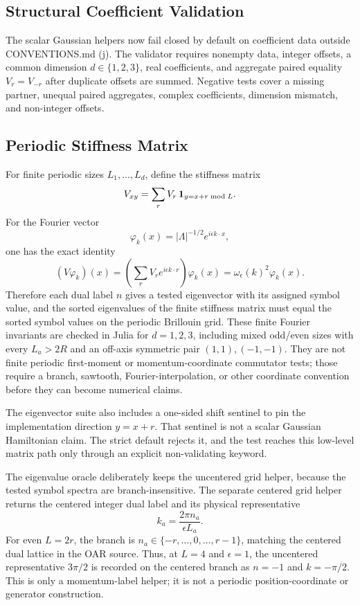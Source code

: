 \subsection{Structural Coefficient Validation}

The scalar Gaussian helpers now fail closed by default on coefficient data
outside CONVENTIONS.md (j).  The validator requires nonempty data, integer
offsets, a common dimension \(d\in\{1,2,3\}\), real coefficients, and aggregate
paired equality \(V_r=V_{-r}\) after duplicate offsets are summed.  Negative
tests cover a missing partner, unequal paired aggregates, complex coefficients,
dimension mismatch, and non-integer offsets.

\subsection{Periodic Stiffness Matrix}

For finite periodic sizes \(L_1,\ldots,L_d\), define the stiffness matrix
\[
  V_{xy}
  =
  \sum_r V_r\,\mathbf 1_{y=x+r\;{\rm mod}\;L}.
\]
For the Fourier vector
\[
  \varphi_k(x)=|\Lambda|^{-1/2}e^{i\epsilon k\cdot x},
\]
one has the exact identity
\[
  (V\varphi_k)(x)
  =
  \left(\sum_rV_re^{i\epsilon k\cdot r}\right)\varphi_k(x)
  =
  \omega_\epsilon(k)^2\varphi_k(x).
\]
Therefore each dual label \(n\) gives a tested eigenvector with its assigned
symbol value, and the sorted eigenvalues of the finite stiffness matrix must
equal the sorted symbol values on the periodic Brillouin grid.  These finite
Fourier invariants are checked in Julia for \(d=1,2,3\), including mixed
odd/even sizes with every \(L_a>2R\) and an off-axis symmetric pair
\((1,1),(-1,-1)\).  They are not finite periodic first-moment or
momentum-coordinate commutator tests; those require a branch, sawtooth,
Fourier-interpolation, or other coordinate convention before they can become
numerical claims.

The eigenvector suite also includes a one-sided shift sentinel to pin the
implementation direction \(y=x+r\).  That sentinel is not a scalar Gaussian
Hamiltonian claim.  The strict default rejects it, and the test reaches this
low-level matrix path only through an explicit non-validating keyword.

The eigenvalue oracle deliberately keeps the uncentered grid helper, because
the tested symbol spectra are branch-insensitive.  The separate centered grid
helper returns the centered integer dual label and its physical representative
\[
  k_a = \frac{2\pi n_a}{\epsilon L_a}.
\]
For even \(L=2r\), the branch is \(n_a\in\{-r,\ldots,0,\ldots,r-1\}\), matching
the centered dual lattice in the OAR source.  Thus, at \(L=4\) and
\(\epsilon=1\), the uncentered representative \(3\pi/2\) is recorded on the
centered branch as \(n=-1\) and \(k=-\pi/2\).  This is only a momentum-label
helper; it is not a periodic position-coordinate or generator construction.

